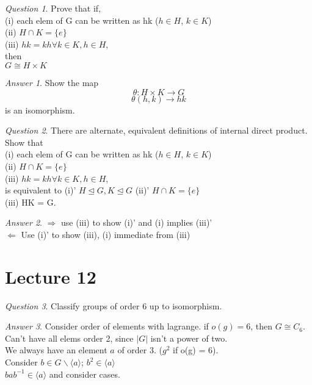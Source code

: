 \documentclass[]{article}
\theoremstyle{remark}
\theoremstyle{qnstyle}
\newtheorem{question}{Question}
\theoremstyle{answerstyle}
\newtheorem*{answer}{Answer}
\begin{document}
\begin{question}
    Prove that if, \\
    (i) each elem of G can be written as hk ($h \in H$, $k \in K$)\\
    (ii) $H \cap K = \{ e\}$\\
    (iii) $hk = kh \forall k \in K, h \in H$, \\
    then \\
    $G \cong H \times K$
\end{question}
\begin{answer}
    Show the map $$\theta: H \times K \to G$$
    $$\theta (h,k) \to hk$$
    is an isomorphism. 
\end{answer}

\begin{question}
    There are alternate, equivalent definitions of internal direct product. \\
    Show that \\
    (i) each elem of G can be written as hk ($h \in H$, $k \in K$)\\
    (ii) $H \cap K = \{ e\}$\\
    (iii) $hk = kh \forall k \in K, h \in H$, \\
    is equivalent to
    (i)' $H \trianglelefteq G, K \trianglelefteq G$
    (ii)' $H \cap K = \{ e\}$\\
    (iii) HK = G.
\end{question}
\begin{answer}
    $\Rightarrow$ use (iii) to show (i)' and (i) implies (iii)'\\
    $\Leftarrow$ Use (i)' to show (iii), (i) immediate from (iii)
\end{answer}






\section* {Lecture 12}

\begin{question}
    Classify groups of order 6 up to isomorphism.
\end{question}
\begin{answer}
    Consider order of elements with lagrange. if $o(g) = 6$, then $G \cong C_6$.\\
    Can't have all elems order 2, since $|G|$ isn't a power of two.\\
    We always have an element $a$ of order 3. ($g^2$ if o(g) = 6).\\
    Consider $b \in G \backslash \langle a \rangle$; $b^2 \in \langle a \rangle$ \\
    $bab^{-1} \in \langle a \rangle$ and consider cases.
\end{answer}
\end{document}
